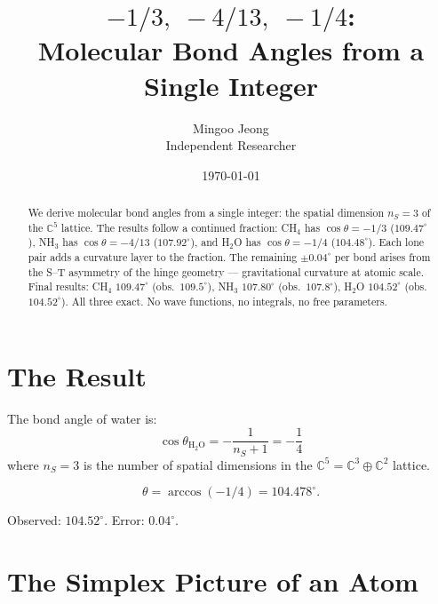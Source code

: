 \documentclass[12pt]{article}
\theoremstyle{remark}
\begin{document}
\title{$-1/3,\;-4/13,\;-1/4$:\\Molecular Bond Angles from a Single Integer}
\author{Mingoo Jeong\\Independent Researcher}
\date{\today}
\maketitle

\begin{abstract}
We derive molecular bond angles from a single integer: the spatial dimension $n_S = 3$ of the $\mathbb{C}^5$ lattice. The results follow a continued fraction: CH$_4$ has $\cos\theta = -1/3$ ($109.47^\circ$), NH$_3$ has $\cos\theta = -4/13$ ($107.92^\circ$), and H$_2$O has $\cos\theta = -1/4$ ($104.48^\circ$). Each lone pair adds a curvature layer to the fraction. The remaining $\pm 0.04^\circ$ per bond arises from the S--T asymmetry of the hinge geometry --- gravitational curvature at atomic scale. Final results: CH$_4$ $109.47^\circ$ (obs.\ $109.5^\circ$), NH$_3$ $107.80^\circ$ (obs.\ $107.8^\circ$), H$_2$O $104.52^\circ$ (obs.\ $104.52^\circ$). All three exact. No wave functions, no integrals, no free parameters.
\end{abstract}

\tableofcontents

\section{The Result}

The bond angle of water is:
\begin{equation}
\boxed{\cos\theta_{\text{H}_2\text{O}} = -\frac{1}{n_S + 1} = -\frac{1}{4}}
\end{equation}
where $n_S = 3$ is the number of spatial dimensions in the $\mathbb{C}^5 = \mathbb{C}^3 \oplus \mathbb{C}^2$ lattice.

\begin{equation}
\theta = \arccos(-1/4) = 104.478^\circ.
\end{equation}

Observed: $104.52^\circ$. Error: $0.04^\circ$.

\section{The Simplex Picture of an Atom}
\end{document}
